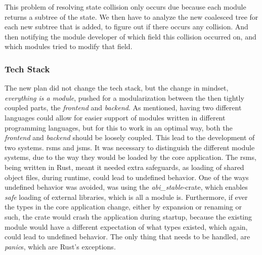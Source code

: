 
This problem of resolving state collision only occurs due because each module
returns a subtree of the state. We then have to analyze the new coalesced tree
for each new subtree that is added, to figure out if there occurs any collision.
And then notifying the module developer of which field this collision occurred
on, and which modules tried to modify that field.

\subsubsection{Tech Stack}

The new plan did not change the tech stack, but the change in mindset,
\textit{everything is a module}, pushed for a modularization between the then
tightly coupled parts, the \textit{frontend} and \textit{backend}. As mentioned,
having two different languages could allow for easier support of modules written
in different programming languages, but for this to work in an optimal way, both
the \textit{frontend} and \textit{backend} should be loosely coupled. This lead
to the development of two systems. \gls{rsms} and \gls{jsms}. It was necessary
to distinguish the different module systems, due to the way they would be loaded
by the core application.
The \gls{rsms}, being written in Rust, meant it needed extra safeguards, as
loading of shared object files, during runtime, could lead to undefined
behavior.
One of the ways undefined behavior was avoided, was using the
\textit{abi\_stable}-crate, which enables \textit{safe} loading of external
libraries, which is all a module is.
Furthermore, if ever the types in the core application change, either by
expansion or renaming or such, the crate would crash the application during
startup, because the existing module would have a different expectation of what
types existed, which again, could lead to undefined behavior. The only thing
that needs to be handled, are \textit{panic}s, which are Rust's exceptions.

